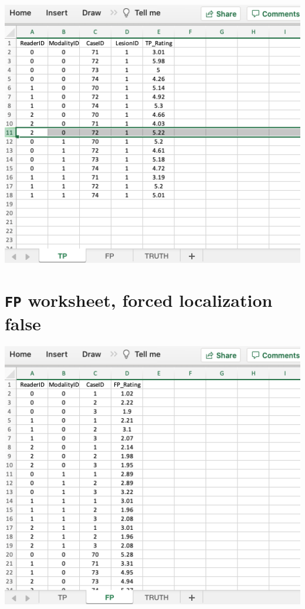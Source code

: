 \documentclass[
]{book}
\begin{document}
\includegraphics[width=1\textwidth,height=\textheight]{images/quick-start/lroc2TP.png}

\hypertarget{quick-start-lroc-fp2}{%
\section{\texorpdfstring{\texttt{FP} worksheet, forced localization false}{FP worksheet, forced localization false}}\label{quick-start-lroc-fp2}}

\includegraphics[width=1\textwidth,height=\textheight]{images/quick-start/lroc2FP1.png}
\end{document}
